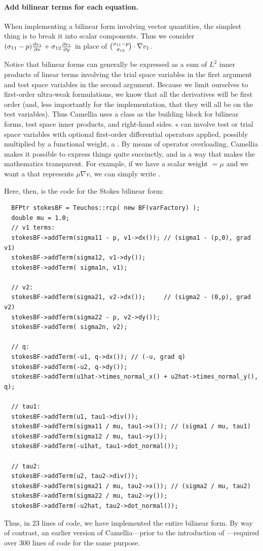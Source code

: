 \paragraph{Add bilinear terms for each equation.}
When implementing a bilinear form involving vector quantities, the simplest thing is to break it into scalar components.  Thus we consider $(\sigma_{11} - p) \NVRpd{v_{1}}{x} + \sigma_{12} \NVRpd{v_{1}}{y}$ in place of ${\sigma_{11} - p \choose \sigma_{12}} \cdot \NVRgrad v_{1}$.

Notice that bilinear forms can generally be expressed as a sum of $L^{2}$ inner products of linear terms involving the trial space variables in the first argument and test space variables in the second argument.  Because we limit ourselves to first-order ultra-weak formulations, we know that all the derivatives will be first order (and, less importantly for the implementation, that they will all be on the test variables).  Thus Camellia uses a  class as the building block for bilinear forms, test space inner products, and right-hand sides.  s can involve test or trial space variables with optional first-order differential operators applied, possibly multiplied by a functional weight, a .  By means of operator overloading, Camellia makes it possible to express things quite succinctly, and in a way that makes the mathematics transparent.  For example, if we have a scalar weight  $= \mu$ and we want a  that represents $\mu \nabla v$, we can simply write .

Here, then, is the code for the Stokes bilinear form:
\begin{lstlisting}
  BFPtr stokesBF = Teuchos::rcp( new BF(varFactory) );
  double mu = 1.0;
  // v1 terms:
  stokesBF->addTerm(sigma11 - p, v1->dx()); // (sigma1 - (p,0), grad v1) 
  stokesBF->addTerm(sigma12, v1->dy());
  stokesBF->addTerm( sigma1n, v1);
  
  // v2:
  stokesBF->addTerm(sigma21, v2->dx());     // (sigma2 - (0,p), grad v2)
  stokesBF->addTerm(sigma22 - p, v2->dy());
  stokesBF->addTerm( sigma2n, v2);
  
  // q:
  stokesBF->addTerm(-u1, q->dx()); // (-u, grad q)
  stokesBF->addTerm(-u2, q->dy());
  stokesBF->addTerm(u1hat->times_normal_x() + u2hat->times_normal_y(), q);
  
  // tau1:
  stokesBF->addTerm(u1, tau1->div());
  stokesBF->addTerm(sigma11 / mu, tau1->x()); // (sigma1 / mu, tau1)
  stokesBF->addTerm(sigma12 / mu, tau1->y());
  stokesBF->addTerm(-u1hat, tau1->dot_normal());
  
  // tau2:
  stokesBF->addTerm(u2, tau2->div());
  stokesBF->addTerm(sigma21 / mu, tau2->x()); // (sigma2 / mu, tau2)
  stokesBF->addTerm(sigma22 / mu, tau2->y());
  stokesBF->addTerm(-u2hat, tau2->dot_normal());
\end{lstlisting} 
Thus, in 23 lines of code, we have implemented the entire bilinear form.  By way of contrast, an earlier version of Camellia---prior to the introduction of ---required over 300 lines of code for the same purpose.

